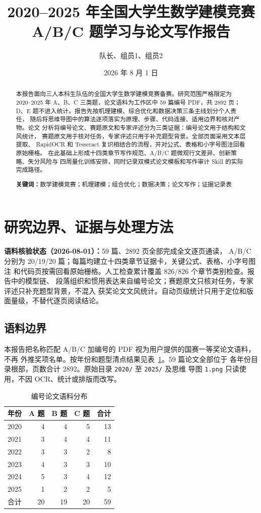 \documentclass[UTF8,a4paper,12pt]{ctexart}
\title{\bfseries 2020--2025 年全国大学生数学建模竞赛\\A/B/C 题学习与论文写作报告}
\author{队长、组员1、组员2}
\date{2026 年 8 月 1 日}
\newcommand{\keywords}[1]{\par\noindent\textbf{关键词：}#1}
\begin{document}
\maketitle

\begin{abstract}
本报告面向三人本科生队伍的全国大学生数学建模竞赛备赛。研究范围严格限定为
2020--2025 年 A、B、C 三类题，论文语料为工作区中 59 篇编号 PDF，共 2892 页；
D、E 题不进入统计。报告先按机理建模、综合优化和数据决策三条主线划分个人责任，
随后将思维导图中的算法逐项落实为原理、步骤、代码连接、适用边界和核对产物。论文
分析将编号论文、赛题原文和专家评述分为三类证据：编号论文用于结构和文风统计，
赛题原文用于核对任务，专家评述只用于补充题型背景。全部页面采用文本层提取、
RapidOCR 和 Tesseract 复识相结合的流程，并对公式、表格和小字号图注回看原始栅格。
在此基础上形成十四类章节写作规范、A/B/C 题微观行文差异、创新策略、失分风险与
四周量化训练安排，同时记录双模式论文模板和写作审计 Skill 的实际完成路径。

\keywords{数学建模竞赛；机理建模；组合优化；数据决策；论文写作；证据记录表}
\end{abstract}

\tableofcontents
\newpage

\section{研究边界、证据与处理方法}

\noindent\textbf{语料核验状态（2026-08-01）：}59 篇、2892 页全部完成全文逐页通读，
A/B/C 分别为 20/19/20 篇；每篇均建立十四类章节证据卡，关键公式、表格、小字号图注
和代码页按需回看原始栅格。人工检查累计覆盖 826/826 个章节类别检查。报告中的模型链、
段落组织和惯用表达来自编号论文；赛题原文只核对任务，专家评述只补充题型背景，不混入
获奖论文文风统计。自动页级统计只用于定位和版面量级，不替代逐页阅读结论。

\subsection{语料边界}

本报告把名称匹配 A/B/C 加编号的 PDF 视为用户提供的国赛一等奖论文语料，不再
外推奖项名单。按年份和题型清点结果见表~\ref{tab:corpus-count}。59 篇论文全部位于
各年份目录根部，页数合计 2892。原始目录 \texttt{2020/} 至 \texttt{2025/} 及思维
导图 \texttt{1.png} 只读使用，不因 OCR、统计或排版而改写。

\begin{table}[htbp]
\centering
\caption{编号论文语料分布}
\label{tab:corpus-count}
\begin{tabular}{crrrr}
\toprule
年份 & A 题 & B 题 & C 题 & 合计\\
\midrule
2020 & 4 & 4 & 5 & 13\\
2021 & 3 & 4 & 4 & 11\\
2022 & 3 & 3 & 2 & 8\\
2023 & 4 & 3 & 3 & 10\\
2024 & 5 & 3 & 4 & 12\\
2025 & 1 & 2 & 2 & 5\\
\midrule
合计 & 20 & 19 & 20 & 59\\
\bottomrule
\end{tabular}
\end{table}
\end{document}
